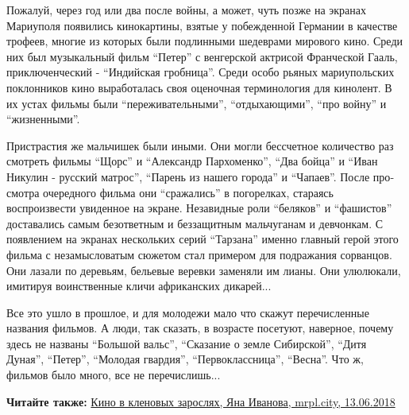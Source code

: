 Пожалуй, через год или два после войны, а может, чуть позже на экранах
Мариуполя появились кинокартины, взятые у побежденной Германии в качестве
трофеев, многие из которых были подлинными шедеврами мирового кино. Среди них
был музыкальный фильм \enquote{Петер} с венгерской актрисой Франческой Гааль,
приключенческий - \enquote{Индийская гробница}. Среди особо рьяных мариупольских
поклонников кино выработалась своя оценочная терминология для кинолент. В их
устах фильмы были \enquote{переживательными}, \enquote{отдыхающими}, \enquote{про войну} и
\enquote{жизненными}.

Пристрастия же мальчишек были иными. Они могли бес­счетное количество раз
смотреть фильмы \enquote{Щорс} и \enquote{Александр Пархоменко}, \enquote{Два бойца} и \enquote{Иван Никулин -
русский матрос}, \enquote{Парень из нашего города} и \enquote{Чапаев}. После про­смотра
очередного фильма они \enquote{сражались} в погорелках, стараясь воспроизвести
увиденное на экране. Незавидные роли \enquote{беляков} и \enquote{фашистов} доставались самым
безот­ветным и беззащитным мальчуганам и девчонкам. С появлением на экранах
нескольких серий \enquote{Тарзана} именно главный герой этого фильма с незамысловатым
сюжетом стал примером для подражания сорванцов. Они лазали по деревьям,
бельевые веревки заменяли им лианы. Они улюлюкали, имитируя воинственные кличи
африканских дикарей...

Все это ушло в прошлое, и для молодежи мало что скажут перечисленные названия
фильмов. А люди, так сказать, в возрасте посетуют, наверное, почему здесь не
названы \enquote{Большой вальс}, \enquote{Сказание о земле Сибирской}, \enquote{Дитя Дуная}, \enquote{Петер},
\enquote{Молодая гвардия}, \enquote{Первоклассница}, \enquote{Весна}. Что ж, фильмов было много, все
не перечислишь...

\textbf{Читайте также:} \href{https://mrpl.city/blogs/view/kino-v-klenovyh-zaroslyah}{Кино в кленовых зарослях, Яна Иванова, mrpl.city, 13.06.2018}
